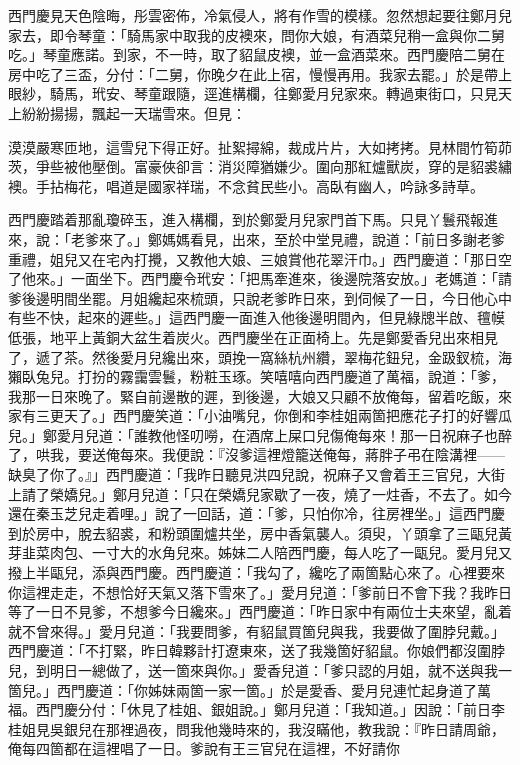 西門慶見天色陰晦，彤雲密佈，冷氣侵人，將有作雪的模樣。忽然想起要往鄭月兒家去，即令琴童：「騎馬家中取我的皮襖來，問你大娘，有酒菜兒稍一盒與你二舅吃。」琴童應諾。到家，不一時，取了貂鼠皮襖，並一盒酒菜來。西門慶陪二舅在房中吃了三盃，分付：「二舅，你晚夕在此上宿，慢慢再用。我家去罷。」於是帶上眼紗，騎馬，玳安、琴童跟隨，逕進構欄，往鄭愛月兒家來。轉過東街口，只見天上紛紛揚揚，飄起一天瑞雪來。但見：

\begin{myquote} 
漠漠嚴寒匝地，這雪兒下得正好。扯絮撏綿，裁成片片，大如拷拷。見林間竹筍茆茨，爭些被他壓倒。富豪俠卻言：消災障猶嫌少。圍向那紅爐獸炭，穿的是貂裘繡襖。手拈梅花，唱道是國家祥瑞，不念貧民些小。高臥有幽人，吟詠多詩草。
\end{myquote} 

西門慶踏着那亂瓊碎玉，進入構欄，到於鄭愛月兒家門首下馬。只見丫鬟飛報進來，說：「老爹來了。」鄭媽媽看見，出來，至於中堂見禮，說道：「前日多謝老爹重禮，姐兒又在宅內打攪，又教他大娘、三娘賞他花翠汗巾。」西門慶道：「那日空了他來。」一面坐下。西門慶令玳安：「把馬牽進來，後邊院落安放。」老媽道：「請爹後邊明間坐罷。月姐纔起來梳頭，只說老爹昨日來，到伺候了一日，今日他心中有些不快，起來的遲些。」這西門慶一面進入他後邊明間內，但見綠牕半啟、氊幙低張，地平上黃銅大盆生着炭火。西門慶坐在正面椅上。先是鄭愛香兒出來相見了，遞了茶。然後愛月兒纔出來，頭挽一窩絲杭州纘，翠梅花鈕兒，金趿釵梳，海獺臥兔兒。打扮的霧靄雲鬟，粉粧玉琢。笑嘻嘻向西門慶道了萬福，說道：「爹，我那一日來晚了。緊自前邊散的遲，到後邊，大娘又只顧不放俺每，留着吃飯，來家有三更天了。」西門慶笑道：「小油嘴兒，你倒和李桂姐兩箇把應花子打的好響瓜兒。」鄭愛月兒道：「誰教他怪叨嘮，在酒席上屎口兒傷俺每來！那一日祝麻子也醉了，哄我，要送俺每來。我便說：『沒爹這裡燈籠送俺每，蔣胖子弔在陰溝裡——缺臭了你了。』」西門慶道：「我昨日聽見洪四兒說，祝麻子又會着王三官兒，大街上請了榮嬌兒。」鄭月兒道：「只在榮嬌兒家歇了一夜，燒了一炷香，不去了。如今還在秦玉芝兒走着哩。」說了一回話，道：「爹，只怕你冷，往房裡坐。」這西門慶到於房中，脫去貂裘，和粉頭圍爐共坐，房中香氣襲人。須臾，丫頭拿了三甌兒黃芽韭菜肉包、一寸大的水角兒來。姊妹二人陪西門慶，每人吃了一甌兒。愛月兒又撥上半甌兒，添與西門慶。西門慶道：「我勾了，纔吃了兩箇點心來了。心裡要來你這裡走走，不想恰好天氣又落下雪來了。」愛月兒道：「爹前日不會下我？我昨日等了一日不見爹，不想爹今日纔來。」西門慶道：「昨日家中有兩位士夫來望，亂着就不曾來得。」愛月兒道：「我要問爹，有貂鼠買箇兒與我，我要做了圍脖兒戴。」西門慶道：「不打緊，昨日韓夥計打遼東來，送了我幾箇好貂鼠。你娘們都沒圍脖兒，到明日一總做了，送一箇來與你。」愛香兒道：「爹只認的月姐，就不送與我一箇兒。」西門慶道：「你姊妹兩箇一家一箇。」{}於是愛香、愛月兒連忙起身道了萬福。西門慶分付：「休見了桂姐、銀姐說。」鄭月兒道：「我知道。」因說：「前日李桂姐見吳銀兒在那裡過夜，問我他幾時來的，我沒瞞他，教我說：『昨日請周爺，俺每四箇都在這裡唱了一日。爹說有王三官兒在這裡，不好請你
